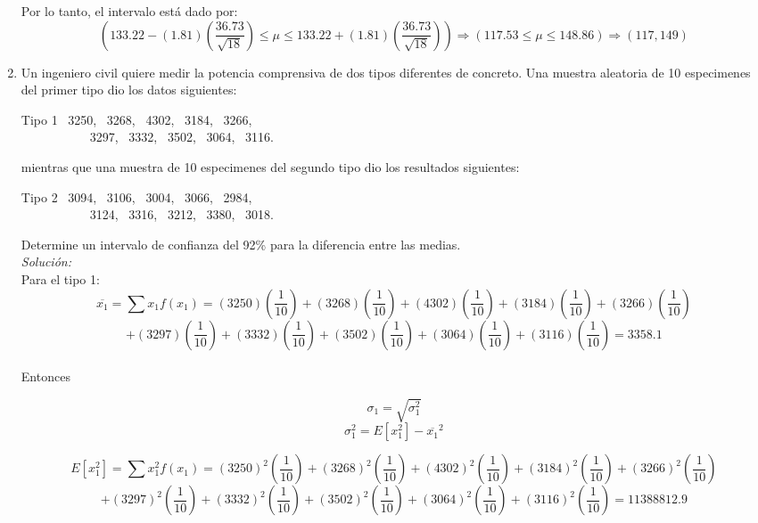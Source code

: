 \begin{enumerate}
    Por lo tanto, el intervalo está dado por: 
    $$ \left( 133.22 - (1.81) \left( \frac{36.73}{\sqrt{18}} \right) \leq  \mu \leq 133.22 + (1.81) \left( \frac{36.73}{\sqrt{18}} \right) \right)  \Rightarrow  \left( 117.53 \leq \mu \leq 148.86 \right) \Rightarrow \left( 117,149 \right) $$
    \item Un ingeniero civil quiere medir la potencia comprensiva de dos tipos diferentes de concreto. Una muestra aleatoria de 10 especimenes del primer tipo dio los datos siguientes:
    
    \begin{center} Tipo 1 \ 3250, \ 3268, \ 4302, \ 3184, \ 3266, \\
        \ \ \ \ \ \ \ \ \ \ \ 3297, \ 3332, \ 3502, \ 3064, \ 3116. 
    \end{center}
    mientras que una muestra de 10 especimenes del segundo tipo dio los resultados siguientes:
    
    \begin{center} Tipo 2 \ 3094, \ 3106, \ 3004, \ 3066, \ 2984, \\
        \ \ \ \ \ \ \ \ \ \ \ 3124, \ 3316, \ 3212, \ 3380, \ 3018. 
    \end{center}
    
    Determine un intervalo de confianza del 92\% para la diferencia entre las medias. \\
    
    \textit{Solución: } \\
    Para el tipo 1:
    $$ \overline{x_{1}} = \sum x_{1}f(x_{1})= (3250)\left( \frac{1}{10} \right) + (3268)\left( \frac{1}{10} \right) + (4302)\left( \frac{1}{10} \right) + (3184)\left( \frac{1}{10} \right) + (3266)\left( \frac{1}{10} \right) $$ $$ +  (3297)\left( \frac{1}{10} \right) + (3332)\left( \frac{1}{10} \right)+ (3502)\left( \frac{1}{10} \right) + (3064)\left( \frac{1}{10} \right) + (3116)\left( \frac{1}{10} \right) = 3358.1 $$
    \\
    Entonces
    
    $$ \sigma_{1} = \sqrt{\sigma_{1}^2} $$
    $$ \sigma_{1}^2 = E[x_{1}^2] - \overline{x_{1}}^2 $$
    
    $$ E[x_{1}^2] = \sum x_{1}^2f(x_{1})= (3250)^2\left( \frac{1}{10} \right) + (3268)^2\left( \frac{1}{10} \right) + (4302)^2\left( \frac{1}{10} \right) + (3184)^2\left( \frac{1}{10} \right) + (3266)^2\left( \frac{1}{10} \right) $$ $$ +  (3297)^2\left( \frac{1}{10} \right) +(3332)^2\left( \frac{1}{10} \right)+ (3502)^2\left( \frac{1}{10} \right) + (3064)^2\left( \frac{1}{10} \right) + (3116)^2\left( \frac{1}{10} \right) = 11388812.9 $$
    

\end{enumerate}
